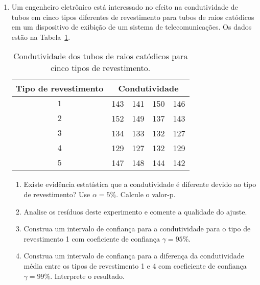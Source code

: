 \documentclass[11pt, a4paper]{article}
\begin{document}
\begin{enumerate}
	\item Um engenheiro eletrônico está interessado no efeito na condutividade de tubos em cinco tipos diferentes de revestimento para tubos de raios catódicos em um dispositivo de exibição de um sistema de telecomunicações. Os dados estão na Tabela~\ref{tab:condutividade-telecomunicacoes}.
	\begin{table}[htbp]
		\centering
		\begin{tabular}{c|cccc}
			\toprule[0.05cm]
			Tipo de revestimento & \multicolumn{4}{|c}{Condutividade} \\ \midrule[0.025cm]
			$1$ & 143 & 141 & 150 & 146 \\
			$2$ & 152 & 149 & 137 & 143\\
			$3$ & 134 & 133 & 132 & 127\\
			$4$ & 129 & 127 & 132 & 129\\
			$5$ & 147 & 148 & 144 & 142\\
			\bottomrule[0.05cm]
		\end{tabular}
		\caption{Condutividade dos tubos de raios catódicos para cinco tipos de revestimento.}
		\label{tab:condutividade-telecomunicacoes}
	\end{table}
	\begin{enumerate}
		\item Existe evidência estatística que a condutividade é diferente devido ao tipo de revestimento? Use $\alpha=5\%$. Calcule o valor-p.
		\item Analise os resíduos deste experimento e comente a qualidade do ajuste.
		\item Construa um intervalo de confiança para a condutividade para o tipo de revestimento 1 com coeficiente de confiança $\gamma=95\%$.
		\item Construa um intervalo de confiança para a diferença da condutividade média entre os tipos de revestimento 1 e 4 com coeficiente de confiança $\gamma=99\%$. Interprete o resultado.
	\end{enumerate}


\end{enumerate}
\end{document}
